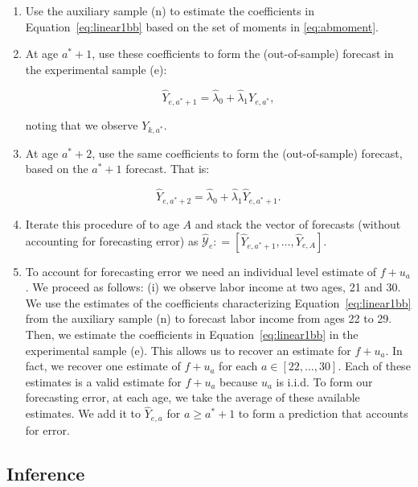 \begin{enumerate}
\item Use the auxiliary sample (n) to estimate the coefficients in Equation~\eqref{eq:linear1bb} based on the set of moments in \eqref{eq:abmoment}.
\item At age $a^*+1$, use these coefficients to form the (out-of-sample) forecast in the experimental sample (e):

\begin{equation}
\hat{Y}_{e,a^* + 1} = \hat{\lambda}_{0} + \hat{\lambda}_{1} Y_{e,a^*},
\end{equation}

\noindent noting that we observe $Y_{k,a^*}$.

\item At age $a^*+2$, use the same coefficients to form the (out-of-sample) forecast, based on the $a^*+1$ forecast. That is:

\begin{equation}
\hat{Y}_{e,a^* + 2} = \hat{\lambda}_{0} + \hat{\lambda}_{1} \hat{Y}_{e,a^*+1}.
\end{equation}

\item Iterate this procedure of to age $A$ and stack the vector of forecasts (without accounting for forecasting error) as $\hat{\mathcal{Y}}_{e} : = \left[ \hat{Y}_{e,a^*+1}, \ldots,  \hat{Y}_{e,A} \right]$.

\item To account for forecasting error we need an individual level estimate of $f + u_{a}$. We proceed as follows: (i) we observe labor income at two ages, 21 and 30. We use the estimates of the coefficients characterizing Equation~\eqref{eq:linear1bb} from the auxiliary sample (n) to forecast labor income from ages 22 to 29. Then, we estimate the coefficients in Equation~\eqref{eq:linear1bb} in the experimental sample (e). This allows us to recover an estimate for $f + u_{a}$. In fact, we recover one estimate of $f + u_{a}$ for each $a \in \left[22, \ldots, 30 \right]$. Each of these estimates is a valid estimate for $f + u_{a}$ because $u_{a}$ is i.i.d. To form our forecasting error, at each age, we take the average of these available estimates. We add it to  $\hat{Y}_{e,a}$ for $a \geq a^* + 1$ to form a prediction that accounts for error.
\end{enumerate}


\subsection{Inference} \label{appendix:bootstrap}

